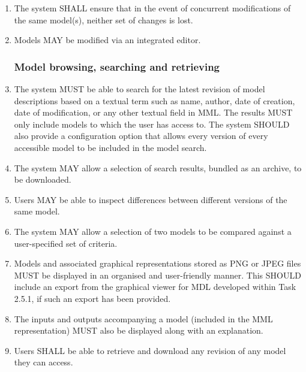 \begin{enumerate}[1]
\item The system SHALL ensure that in the event of concurrent modifications of the same model(s), neither set of changes is lost.

\item Models MAY be modified via an integrated editor.

\subsubsection{Model browsing, searching and retrieving}
\item The system MUST be able to search for the latest revision of model descriptions based on a textual term such as name, author, date of creation, date of modification, or any other textual field in MML. The results MUST only include models to which the user has access to. The system SHOULD also provide a configuration option that allows every version of every accessible model to be included in the model search.


\item The system MAY allow a selection of search results, bundled as an archive, to be downloaded.

\item Users MAY be able to inspect differences between different versions of the same model.

\item The system MAY allow a selection of two models to be compared against a user-specified set of criteria.

\item Models and associated graphical representations stored as PNG or JPEG files MUST be displayed in an organised and user-friendly manner. This SHOULD include an export from the graphical viewer for MDL developed within Task 2.5.1, if such an export has been provided.

\item The inputs and outputs accompanying a model (included in the MML representation) MUST also be displayed along with an explanation. 

\item Users SHALL be able to retrieve and download any revision of any model they can access.


\end{enumerate}
